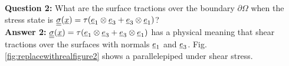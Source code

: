 \documentclass[letter,12pt]{article}
\begin{document}
\newpage
\noindent \textbf{Question 2:} What are the surface tractions over the boundary $\partial \Omega$ when the stress state is $\underline{\underline{\sigma}} (\underline{x}) = \tau (\underline{e}_1 \otimes \underline{e}_3 + \underline{e}_3 \otimes \underline{e}_1 )$? \\

\noindent \textbf{Answer 2:}  $\underline{\underline{\sigma}} (\underline{x}) = \tau (\underline{e}_1 \otimes \underline{e}_3 + \underline{e}_3 \otimes \underline{e}_1 )$ has a physical meaning that shear tractions over the surfaces with normals $\underline{e}_1$ and $\underline{e}_3$. Fig. \ref{fig:replacewithrealfigure2} shows a parallelepiped under shear stress. \\
\end{document}
